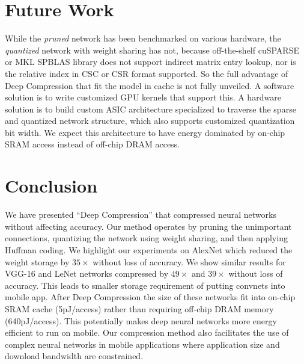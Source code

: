 \documentclass{article} %
\begin{document}
\section{Future Work}
While the \emph{pruned} network has been benchmarked on various hardware, the \emph{quantized} network with weight sharing has not, because off-the-shelf cuSPARSE or MKL SPBLAS library does not support indirect matrix entry lookup, nor is the relative index in CSC or CSR format supported. So the full advantage of Deep Compression that fit the model in  cache is not fully unveiled. A software solution is to write customized GPU kernels that support this.  A hardware solution is to build custom ASIC architecture specialized to traverse the sparse and quantized network structure, which also supports customized quantization bit width. We expect this architecture to have energy dominated by on-chip SRAM access instead of off-chip DRAM access. 


\section{Conclusion}

We have presented ``Deep Compression'' that compressed neural networks without affecting accuracy.
Our method operates by pruning the unimportant connections, quantizing the network using weight sharing, and then applying Huffman coding.
We highlight our experiments on AlexNet which reduced the weight storage by $35\times$ without loss of accuracy.  We show similar results for VGG-16 and LeNet networks compressed by $49\times$ and $39\times$ without loss of accuracy. This leads to smaller storage requirement of putting convnets into mobile app. After Deep Compression the size of these networks fit into on-chip SRAM cache (5pJ/access) rather than requiring off-chip DRAM memory (640pJ/access). This potentially makes deep neural networks more energy efficient to run on mobile. Our compression method also facilitates the use of complex neural networks in mobile applications where application size and download bandwidth are constrained.







\end{document}

